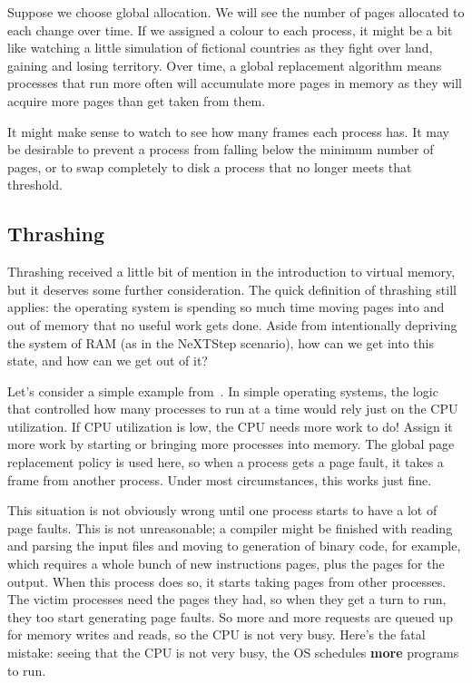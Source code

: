 Suppose we choose global allocation. We will see the number of pages allocated to each change over time. If we assigned a colour to each process, it might be a bit like watching a little simulation of fictional countries as they fight over land, gaining and losing territory. Over time, a global replacement algorithm means processes that run more often will accumulate more pages in memory as they will acquire more pages than get taken from them.

It might make sense to watch to see how many frames each process has. It may be desirable to prevent a process from falling below the minimum number of pages, or to swap completely to disk a process that no longer meets that threshold. 


\subsection*{Thrashing}
Thrashing received a little bit of mention in the introduction to virtual memory, but it deserves some further consideration. The quick definition of thrashing still applies: the operating system is spending so much time moving pages into and out of memory that no useful work gets done. Aside from intentionally depriving the system of RAM (as in the NeXTStep scenario), how can we get into this state, and how can we get out of it?

Let's consider a simple example from~\cite{osc}. In simple operating systems, the logic that controlled how many processes to run at a time would rely just on the CPU utilization. If CPU utilization is low, the CPU needs more work to do! Assign it more work by starting or bringing more processes into memory. The global page replacement policy is used here, so when a process gets a page fault, it takes a frame from another process. Under most circumstances, this works just fine.

This situation is not obviously wrong until one process starts to have a lot of page faults. This is not unreasonable; a compiler might be finished with reading and parsing the input files and moving to generation of binary code, for example, which requires a whole bunch of new instructions pages, plus the pages for the output. When this process does so, it starts taking pages from other processes. The victim processes need the pages they had, so when they get a turn to run, they too start generating page faults. So more and more requests are queued up for memory writes and reads, so the CPU is not very busy. Here's the fatal mistake: seeing that the CPU is not very busy, the OS schedules \textbf{more} programs to run.  

